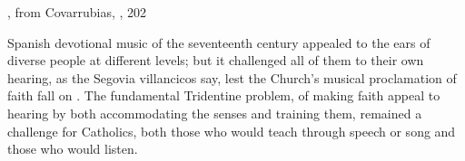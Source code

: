 
{, from Covarrubias,
, 202}

Spanish devotional music of the seventeenth century appealed to the ears of
diverse people at different levels; but it challenged all of them to
 their own hearing, as the Segovia villancicos say, lest the
Church's musical proclamation of faith fall on .
The fundamental Tridentine problem, of making faith appeal to hearing by both
accommodating the senses and training them, remained a challenge for Catholics,
both those who would teach through speech or song and those who would listen.

\endinput
